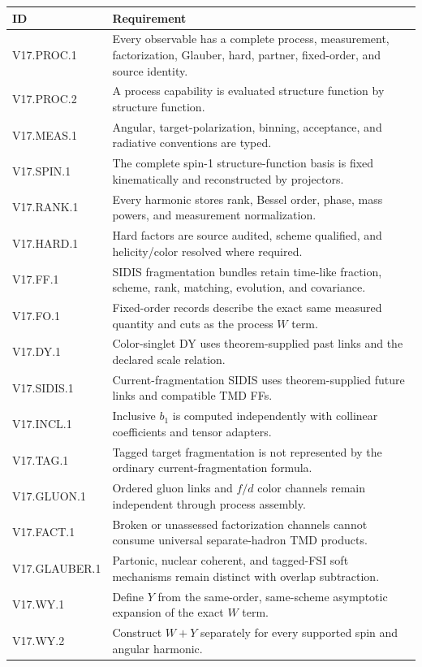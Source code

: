 \documentclass[11pt]{article}
\begin{document}
\footnotesize
\begin{longtable}{L{0.18\textwidth}L{0.74\textwidth}}
\toprule
ID & Requirement\\
\midrule
\endhead
V17.PROC.1 & Every observable has a complete process, measurement, factorization, Glauber, hard, partner, fixed-order, and source identity.\\
V17.PROC.2 & A process capability is evaluated structure function by structure function.\\
V17.MEAS.1 & Angular, target-polarization, binning, acceptance, and radiative conventions are typed.\\
V17.SPIN.1 & The complete spin-1 structure-function basis is fixed kinematically and reconstructed by projectors.\\
V17.RANK.1 & Every harmonic stores rank, Bessel order, phase, mass powers, and measurement normalization.\\
V17.HARD.1 & Hard factors are source audited, scheme qualified, and helicity/color resolved where required.\\
V17.FF.1 & SIDIS fragmentation bundles retain time-like fraction, scheme, rank, matching, evolution, and covariance.\\
V17.FO.1 & Fixed-order records describe the exact same measured quantity and cuts as the process \(W\) term.\\
V17.DY.1 & Color-singlet DY uses theorem-supplied past links and the declared scale relation.\\
V17.SIDIS.1 & Current-fragmentation SIDIS uses theorem-supplied future links and compatible TMD FFs.\\
V17.INCL.1 & Inclusive \(b_1\) is computed independently with collinear coefficients and tensor adapters.\\
V17.TAG.1 & Tagged target fragmentation is not represented by the ordinary current-fragmentation formula.\\
V17.GLUON.1 & Ordered gluon links and \(f/d\) color channels remain independent through process assembly.\\
V17.FACT.1 & Broken or unassessed factorization channels cannot consume universal separate-hadron TMD products.\\
V17.GLAUBER.1 & Partonic, nuclear coherent, and tagged-FSI soft mechanisms remain distinct with overlap subtraction.\\
V17.WY.1 & Define \(Y\) from the same-order, same-scheme asymptotic expansion of the exact \(W\) term.\\
V17.WY.2 & Construct \(W+Y\) separately for every supported spin and angular harmonic.\\

\end{longtable}
\end{document}

